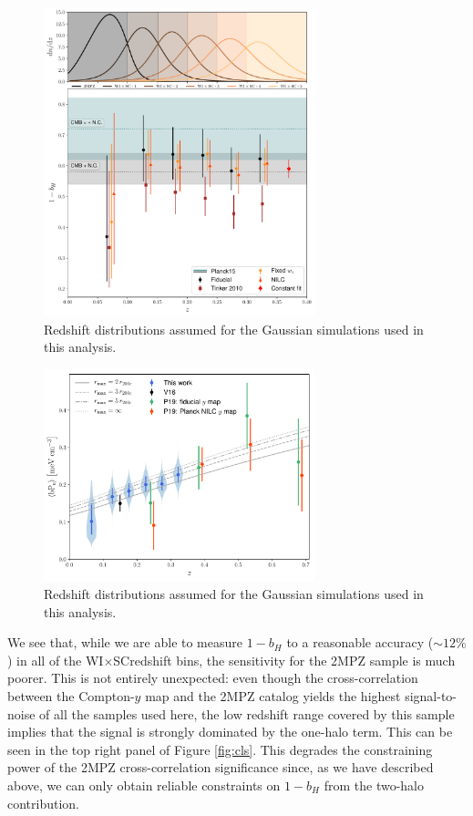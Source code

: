 \documentclass[useAMS,usenatbib]{mn2e}
\newcommand{\wisc}{WI$\times$SC}
\begin{document}
      \begin{figure}
        \centering
        \includegraphics[width=0.7\textwidth]{bhydro.pdf}
        \caption{Redshift distributions assumed for the Gaussian simulations used in this analysis.}
        \label{fig:bh}
      \end{figure}
      \begin{figure}
        \centering
        \includegraphics[width=0.7\textwidth]{by.pdf}
        \caption{Redshift distributions assumed for the Gaussian simulations used in this analysis.}
        \label{fig:by}
      \end{figure}
      
      We see that, while we are able to measure $1-b_H$ to a reasonable accuracy ($\sim12\%$) in all of the \wisc redshift bins, the sensitivity for the 2MPZ sample is much poorer. This is not entirely unexpected: even though the cross-correlation between the Compton-$y$ map and the 2MPZ catalog yields the highest signal-to-noise of all the samples used here, the low redshift range covered by this sample implies that the signal is strongly dominated by the one-halo term. This can be seen in the top right panel of Figure \ref{fig:cls}. This degrades the constraining power of the 2MPZ cross-correlation significance since, as we have described above, we can only obtain reliable constraints on $1-b_H$ from the two-halo contribution.
            
\end{document}
